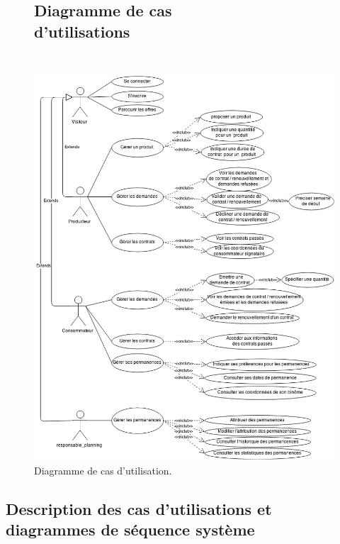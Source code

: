 \documentclass[12pt]{report}
\begin{document}
\begin{figure}[!h]
\centering
\subsection{Diagramme de cas d'utilisations~~~~~~~~~~~~~~~~~~~~~~~~~~~~~~~}
\includegraphics[height=1.35\textwidth]{./ressources/use_case.png}
\caption{Diagramme de cas d'utilisation.}
\end{figure}
\clearpage

\subsection{Description des cas d'utilisations et diagrammes de séquence système}
\end{document}
